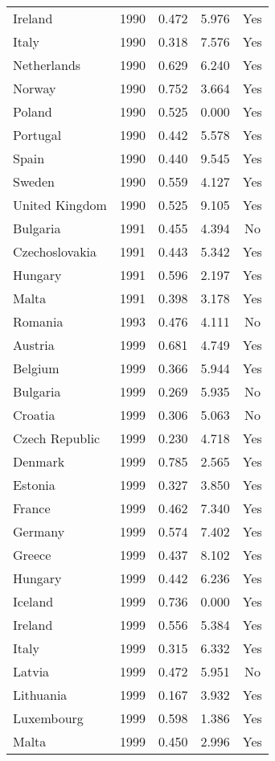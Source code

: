 \documentclass[11pt,]{article}
\begin{document}
\begin{longtable}{lc|ccc}
  Ireland & 1990 & 0.472 & 5.976 & Yes \\ 
  Italy & 1990 & 0.318 & 7.576 & Yes \\ 
  Netherlands & 1990 & 0.629 & 6.240 & Yes \\ 
  Norway & 1990 & 0.752 & 3.664 & Yes \\ 
  Poland & 1990 & 0.525 & 0.000 & Yes \\ 
  Portugal & 1990 & 0.442 & 5.578 & Yes \\ 
  Spain & 1990 & 0.440 & 9.545 & Yes \\ 
  Sweden & 1990 & 0.559 & 4.127 & Yes \\ 
  United Kingdom & 1990 & 0.525 & 9.105 & Yes \\ 
  Bulgaria & 1991 & 0.455 & 4.394 & No \\ 
  Czechoslovakia & 1991 & 0.443 & 5.342 & Yes \\ 
  Hungary & 1991 & 0.596 & 2.197 & Yes \\ 
  Malta & 1991 & 0.398 & 3.178 & Yes \\ 
  Romania & 1993 & 0.476 & 4.111 & No \\ 
  Austria & 1999 & 0.681 & 4.749 & Yes \\ 
  Belgium & 1999 & 0.366 & 5.944 & Yes \\ 
  Bulgaria & 1999 & 0.269 & 5.935 & No \\ 
  Croatia & 1999 & 0.306 & 5.063 & No \\ 
  Czech Republic & 1999 & 0.230 & 4.718 & Yes \\ 
  Denmark & 1999 & 0.785 & 2.565 & Yes \\ 
  Estonia & 1999 & 0.327 & 3.850 & Yes \\ 
  France & 1999 & 0.462 & 7.340 & Yes \\ 
  Germany & 1999 & 0.574 & 7.402 & Yes \\ 
  Greece & 1999 & 0.437 & 8.102 & Yes \\ 
  Hungary & 1999 & 0.442 & 6.236 & Yes \\ 
  Iceland & 1999 & 0.736 & 0.000 & Yes \\ 
  Ireland & 1999 & 0.556 & 5.384 & Yes \\ 
  Italy & 1999 & 0.315 & 6.332 & Yes \\ 
  Latvia & 1999 & 0.472 & 5.951 & No \\ 
  Lithuania & 1999 & 0.167 & 3.932 & Yes \\ 
  Luxembourg & 1999 & 0.598 & 1.386 & Yes \\ 
  Malta & 1999 & 0.450 & 2.996 & Yes \\ 

\end{longtable}
\end{document}
